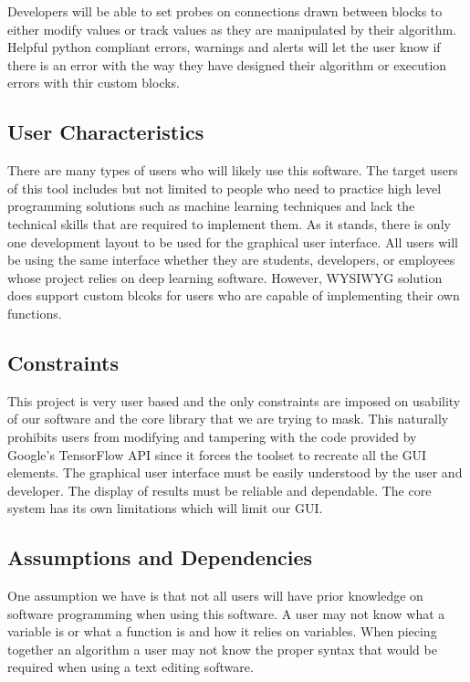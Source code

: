 \documentclass[journal,10pt,onecolumn,compsoc]{IEEEtran} \usepackage[margin=1.0in]{geometry} \usepackage{pdfpages} \usepackage{graphicx}
\begin{document}
Developers will be able to set probes on connections drawn between blocks to either modify values or track values as they are manipulated by their algorithm.
Helpful python compliant errors, warnings and alerts will let the user know if there is an error with the way they have designed their algorithm or execution errors with thir custom blocks.

\subsection{User Characteristics}

There are many types of users who will likely use this software. 
The target users of this tool includes but not limited to people who need to practice high level programming solutions such as machine learning techniques and lack the technical skills that are required to implement them.
As it stands, there is only one development layout to be used for the graphical user interface.
All users will be using the same interface whether they are students, developers, or employees whose project relies on deep learning software. 
However, WYSIWYG solution does support custom blcoks for users who are capable of implementing their own functions.

\subsection{Constraints}

This project is very user based and the only constraints are imposed on usability of our software and the core library that we are trying to mask. 
This naturally prohibits users from modifying and tampering with the code provided by Google's TensorFlow API since it forces the toolset to recreate all the GUI elements.
The graphical user interface must be easily understood by the user and developer.
The display of results must be reliable and dependable.
The core system has its own limitations which will limit our GUI.

\subsection{Assumptions and Dependencies}

One assumption we have is that not all users will have prior knowledge on software programming when using this software.
A user may not know what a variable is or what a function is and how it relies on variables. 
When piecing together an algorithm a user may not know the proper syntax that would be required when using a text editing software.
\end{document}
